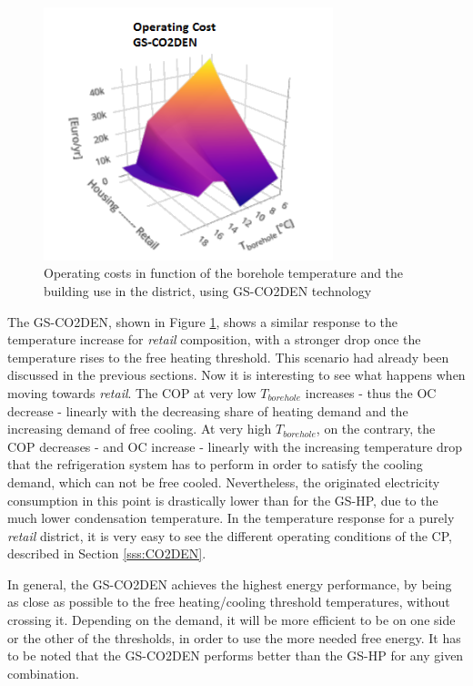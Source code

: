 \documentclass{article}
\begin{document}
\begin{figure}[htp]
	\centering
	\includegraphics[width=0.75\textwidth]{CUTg_SA_CO2_OC.png}
	\caption{Operating costs in function of the borehole temperature and the building use in the district, using GS-CO2DEN technology}
	\label{fig:CUTg_CO2_OC}
\end{figure}

The GS-CO2DEN, shown in Figure \ref{fig:CUTg_CO2_OC}, shows a similar response to the temperature increase for \textit{retail} composition, with a stronger drop once the temperature rises to the free heating threshold. This scenario had already been discussed in the previous sections. Now it is interesting to see what happens when moving towards \textit{retail}. The COP at very low $T_{borehole}$ increases - thus the OC decrease - linearly with the decreasing share of heating demand and the increasing demand of free cooling. At very high $T_{borehole}$, on the contrary, the COP decreases - and OC increase - linearly with the increasing temperature drop that the refrigeration system has to perform in order to satisfy the cooling demand, which can not be free cooled. Nevertheless, the originated electricity consumption in this point is drastically lower than for the GS-HP, due to the much lower condensation temperature. In the temperature response for a purely \textit{retail} district, it is very easy to see the different operating conditions of the CP, described in Section \ref{sss:CO2DEN}. 

In general, the GS-CO2DEN achieves the highest energy performance, by being as close as possible to the free heating/cooling threshold temperatures, without crossing it. Depending on the demand, it will be more efficient to be on one side or the other of the thresholds, in order to use the more needed free energy. It has to be noted that the GS-CO2DEN performs better than the GS-HP for any given combination. 
\end{document}
